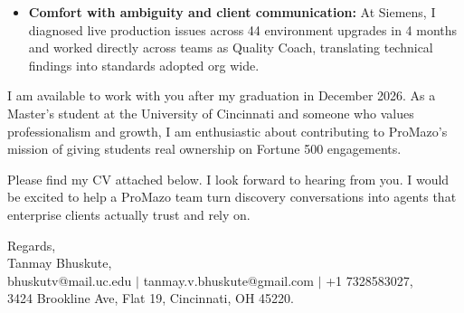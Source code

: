 \documentclass[11pt]{letter}
\begin{document}
\begin{letter}{}
\begin{itemize}[leftmargin=*, itemsep=0.45em]
    \item \textbf{Comfort with ambiguity and client communication:} At Siemens, I diagnosed live production issues across 44 environment upgrades in 4 months and worked directly across teams as Quality Coach, translating technical findings into standards adopted org wide.
\end{itemize}

I am available to work with you after my graduation in December 2026. As a Master's student at the University of Cincinnati and someone who values professionalism and growth, I am enthusiastic about contributing to ProMazo's mission of giving students real ownership on Fortune 500 engagements.

Please find my CV attached below. I look forward to hearing from you. I would be excited to help a ProMazo team turn discovery conversations into agents that enterprise clients actually trust and rely on.

{\setlength{\parskip}{0pt}
Regards,\\
Tanmay Bhuskute,\\
bhuskutv@mail.uc.edu $\mid$ tanmay.v.bhuskute@gmail.com $\mid$ +1 7328583027,\\
3424 Brookline Ave, Flat 19, Cincinnati, OH 45220.
}

\end{letter}
\end{document}

